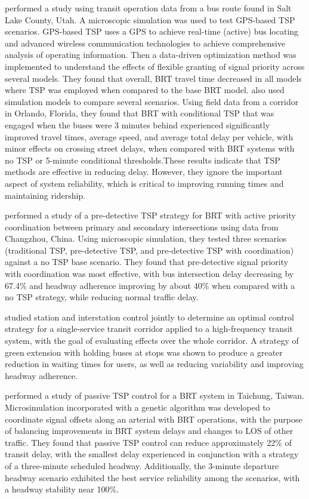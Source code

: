 \documentclass[]{elsarticle} %
\begin{document}
\citet{Liu2018} performed a study using transit operation data from a bus route found
in Salt Lake County, Utah. A microscopic simulation was used to test GPS-based
TSP scenarios. GPS-based TSP uses a GPS to achieve real-time (active) bus
locating and advanced wireless communication technologies to achieve
comprehensive analysis of operating information. Then a data-driven
optimization method was implemented to understand the effects of flexible
granting of signal priority across several models. They found that overall,
BRT travel time decreased in all models where TSP was employed when compared
to the base BRT model. \citet{ALDEEK2017227} also used simulation models to compare
several scenarios. Using field data from a corridor in Orlando, Florida, they
found that BRT with conditional TSP that was engaged when the buses were 3
minutes behind experienced significantly improved travel times, average speed,
and average total delay per vehicle, with minor effects on crossing street
delays, when compared with BRT systems with no TSP or 5-minute conditional
thresholds.These results indicate that TSP methods are effective in reducing
delay. However, they ignore the important aspect of system reliability, which
is critical to improving running times and maintaining ridership.

\citet{YANG20151} performed a study of a pre-detective TSP strategy for BRT with active
priority coordination between primary and secondary intersections using data
from Changzhou, China. Using microscopic simulation, they tested three
scenarios (traditional TSP, pre-detective TSP, and pre-detective TSP with
coordination) against a no TSP base scenario. They found that pre-detective
signal priority with coordination was most effective, with bus intersection
delay decreasing by 67.4\% and headway adherence improving by about 40\% when
compared with a no TSP strategy, while reducing normal traffic delay.

\citet{DELGADO201528} studied station and interstation control jointly to determine an
optimal control strategy for a single-service transit corridor applied to a
high-frequency transit system, with the goal of evaluating effects over the
whole corridor. A strategy of green extension with holding buses at stops was
shown to produce a greater reduction in waiting times for users, as well as
reducing variability and improving headway adherence.

\citet{NI20201} performed a study of passive TSP control for a BRT system in Taichung,
Taiwan. Microsimulation incorporated with a genetic algorithm was developed to
coordinate signal offsets along an arterial with BRT operations, with the
purpose of balancing improvements in BRT system delays and changes to LOS of
other traffic. They found that passive TSP control can reduce approximately
22\% of transit delay, with the smallest delay experienced in conjunction with
a strategy of a three-minute scheduled headway. Additionally, the 3-minute
departure headway scenario exhibited the best service reliability among the
scenarios, with a headway stability near 100\%.
\end{document}
